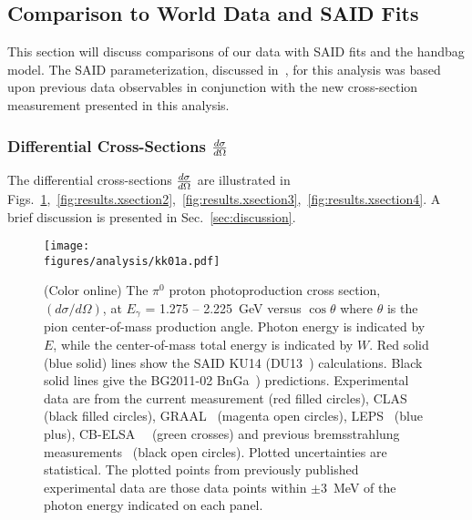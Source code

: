 \subsection{Comparison to World Data and SAID Fits}\label{sec:results.conclusion}
This section will discuss comparisons of our data with SAID fits and the  handbag model. The SAID parameterization, discussed in~\cite{SAID}, for this analysis was based upon previous data observables in conjunction with the new cross-section measurement presented in this analysis.

\subsubsection{Differential Cross-Sections $\frac{\lowercase{d}\sigma}{\lowercase{d}\Omega}$}\label{diffXsection}
The differential cross-sections $\frac{\lowercase{d}\sigma}{\lowercase{d}\Omega}$ are illustrated in Figs.~\ref{fig:results.xsection1},~\ref{fig:results.xsection2},~\ref{fig:results.xsection3},~\ref{fig:results.xsection4}. A brief discussion is presented in Sec.~\ref{sec:discussion}.
\begin{figure}[h!]\begin{center}
\texttt{[image: \\figures/analysis/kk01a.pdf]}%
\caption[The $\pi^0$ proton photoproduction cross section, $(d\sigma/d\Omega)$, at $E_{\gamma}$ = 1.275 -- 2.225~GeV versus $\cos\theta$ where $\theta$ is the pion center-of-mass production angle]{\label{fig:results.xsection1}(Color online) The $\pi^0$ proton photoproduction cross section, $(d\sigma/d\Omega)$, at $E_{\gamma}$ = 1.275 -- 2.225~GeV versus $\cos\theta$ where $\theta$ is the pion center-of-mass production angle. Photon energy is indicated by $E$, while the center-of-mass total energy is indicated by $W$. Red solid (blue solid) lines show the SAID KU14 (DU13~\protect\cite{Dugger13}) calculations. Black solid lines give the BG2011-02 BnGa~\protect\cite{BonnGat}) predictions. Experimental data are from the current measurement (red filled circles), CLAS~\protect\cite{Dugger07} (black filled circles), GRAAL~\protect\cite{Graal} (magenta open circles), LEPS~\protect\cite{LEPS} (blue plus), CB-ELSA~\protect\cite{ELSA05}~\cite{ELSA11} (green crosses) and previous bremsstrahlung measurements~\protect\cite{brem} (black open circles). Plotted uncertainties are statistical. The plotted points from previously published experimental data are those data points within $\pm$3~MeV of the photon energy indicated on each panel.}
\end{center}\end{figure} 

